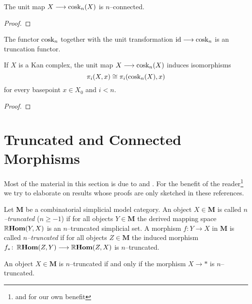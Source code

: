 \begin{proposition}\label{prop:cosk-unit-is-connected}
The unit map \(X\longrightarrow \operatorname{\textnormal{cosk}}_n(X)\) is \(n\)--connected.
\end{proposition}
\begin{proof}
\end{proof}

\begin{corollary}\label{cor:cosk-is-truncation}
  The functor \(\operatorname{\textnormal{cosk}}_n\) together with the unit transformation
  \(\operatorname{\textnormal{id}}\longrightarrow \operatorname{\textnormal{cosk}}_{n}\) is an  truncation functor.
\end{corollary}

\begin{corollary}
  If \(X\) is a Kan complex, the unit map \(X\longrightarrow\operatorname{\textnormal{cosk}}_n(X)\) induces
  isomorphisms
\[
  \pi_{i}(X, x) \cong \pi_{i}(\operatorname{\textnormal{cosk}}_n(X), x)
\]
for every basepoint \(x\in X_{0}\) and \(i<n\).
\end{corollary}
\begin{proof}
\end{proof}


\section{Truncated and Connected Morphisms}
Most of the material in this section is due to \cite{mr2522659} and
\cite{rezkhomotopytoposes}. For the benefit of the reader\footnote{and
  for our own benefit} we try to elaborate on results whose proofs are
only sketched in these references.

\begin{definition}\label{defn:truncated_object}
  Let \(\mathbf{M}\) be a combinatorial simplicial model category. An
  object \(X\in\mathbf{M}\) is called \emph{\(n\)--truncated} (\(n\geq
  -1\)) if for all objects \(Y\in\mathbf{M}\) the derived mapping
  space \(\operatorname{\mathbb{R}\textnormal{\bfseries Hom}}(Y,X)\) is an \(n\)--truncated simplicial set. A
  morphism \(f\colon Y\to X\) in \(\mathbf{M}\) is called
  \emph{\(n\)--truncated} if for all objects \(Z\in\mathbf{M}\) the
  induced morphism \(f_{*}\colon \operatorname{\mathbb{R}\textnormal{\bfseries Hom}}(Z,Y)\longrightarrow\operatorname{\mathbb{R}\textnormal{\bfseries Hom}}(Z,X)\) is
  \(n\)--truncated.
\end{definition}

\begin{remark}
  An object \(X\in\mathbf M\) is \(n\)--truncated if and only if the
  morphism \(X\to *\) is \(n\)--truncated.
\end{remark}

